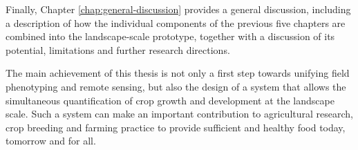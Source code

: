 Finally, Chapter \ref{chap:general-discussion} provides a general discussion, including a description of how the individual components of the previous five chapters are combined into the landscape-scale prototype, together with a discussion of its potential, limitations and further research directions.

The main achievement of this thesis is not only a first step towards unifying field phenotyping and remote sensing, but also the design of a system that allows the simultaneous quantification of crop growth and development at the landscape scale. Such a system can make an important contribution to agricultural research, crop breeding and farming practice to provide sufficient and healthy food today, tomorrow and for all.